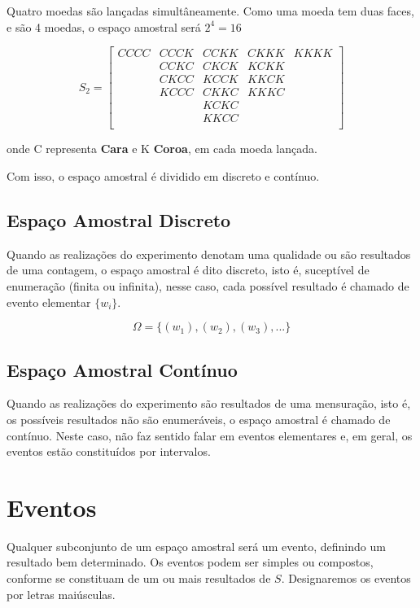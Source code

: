 Quatro moedas são lançadas simultâneamente. Como uma moeda tem duas faces, e são 4 moedas, o espaço amostral será $2^{4}=16$ 

$$
S_{2} =
\left[%
\begin{array}{ccccc}
  CCCC  & CCCK  & CCKK  & CKKK  & KKKK \\
        & CCKC  & CKCK  & KCKK  &      \\
        & CKCC  & KCCK  & KKCK  &      \\
        & KCCC  & CKKC  & KKKC  &      \\
        &       & KCKC  &       &      \\
        &       & KKCC  &       &      \\
\end{array}%
\right]
$$

onde C representa \textbf{Cara} e K \textbf{Coroa}, em cada moeda
lançada.\vskip0.3cm

Com isso, o espaço amostral é dividido em discreto e contínuo.


\subsection{Espaço Amostral Discreto}

Quando as realizações do experimento denotam uma qualidade ou são
resultados de uma contagem, o espaço amostral é dito discreto,
isto é, suceptível de enumeração (finita ou infinita), nesse caso,
cada possível resultado é chamado de evento elementar $\{w_{i}\}$.

$$ \Omega = \{ (w_{1}),(w_{2}),(w_{3}),... \}  $$


\subsection{Espaço Amostral Contínuo}

Quando as realizações do experimento são resultados de uma
mensuração, isto é, os possíveis resultados não são enumeráveis, o
espaço amostral é chamado de contínuo. Neste caso, não faz sentido
falar em eventos elementares e, em geral, os eventos estão
constituídos por intervalos.


\section{Eventos}

Qualquer subconjunto de um espaço amostral será um evento,
definindo um resultado bem determinado. Os eventos podem ser
simples ou compostos, conforme se constituam de um ou mais
resultados de $S$. Designaremos os eventos por letras maiúsculas.


